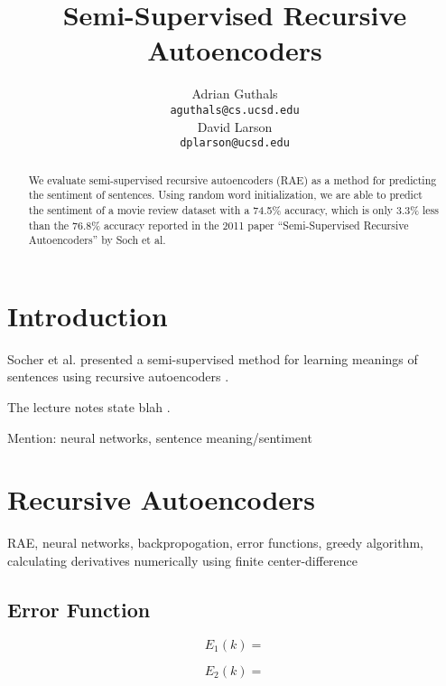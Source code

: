 \documentclass{article}
\title{Semi-Supervised Recursive Autoencoders}
\author{
Adrian Guthals \\
\texttt{aguthals@cs.ucsd.edu} \\
\And
David Larson \\
\texttt{dplarson@ucsd.edu} \\
}
\begin{document}
\maketitle


\begin{abstract}
We evaluate semi-supervised recursive autoencoders (RAE) as a method for predicting the sentiment of sentences. Using random word initialization, we are able to predict the sentiment of a movie review dataset with a 74.5\% accuracy, which is only 3.3\% less than the 76.8\% accuracy reported in the 2011 paper ``Semi-Supervised Recursive Autoencoders'' by Soch et al.
\end{abstract}



\section{Introduction}

Socher et al. presented a semi-supervised method for learning meanings of sentences using recursive autoencoders \cite{Socher}.

The lecture notes state blah \cite{CSE250B}.

Mention: neural networks, sentence meaning/sentiment



\section{Recursive Autoencoders}

RAE, neural networks, backpropogation, error functions, greedy algorithm, calculating derivatives numerically using finite center-difference


\subsection{Error Function}
\begin{equation}
    E_1 (k) =
\end{equation}

\begin{equation}
    E_2 (k) =
\end{equation}
\end{document}
